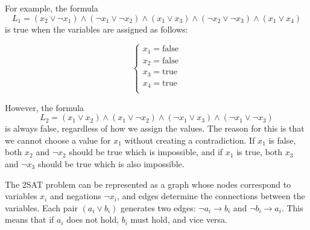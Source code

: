 For example, the formula
\[
L_1 = (x_2 \lor \lnot x_1) \land
      (\lnot x_1 \lor \lnot x_2) \land
      (x_1 \lor x_3) \land
      (\lnot x_2 \lor \lnot x_3) \land
      (x_1 \lor x_4)
\]
is true when the variables are assigned as follows:

\[
\begin{cases}
x_1 = \textrm{false} \\
x_2 = \textrm{false} \\
x_3 = \textrm{true} \\
x_4 = \textrm{true} \\
\end{cases}
\]

However, the formula
\[
L_2 = (x_1 \lor x_2) \land
      (x_1 \lor \lnot x_2) \land
      (\lnot x_1 \lor x_3) \land
      (\lnot x_1 \lor \lnot x_3)
\]
is always false, regardless of how we
assign the values.
The reason for this is that we cannot
choose a value for $x_1$
without creating a contradiction.
If $x_1$ is false, both $x_2$ and $\lnot x_2$
should be true which is impossible,
and if $x_1$ is true, both $x_3$ and $\lnot x_3$
should be true which is also impossible.

The 2SAT problem can be represented as a graph
whose nodes correspond to
variables $x_i$ and negations $\lnot x_i$,
and edges determine the connections
between the variables.
Each pair $(a_i \lor b_i)$ generates two edges:
$\lnot a_i \to b_i$ and $\lnot b_i \to a_i$.
This means that if $a_i$ does not hold,
$b_i$ must hold, and vice versa.

